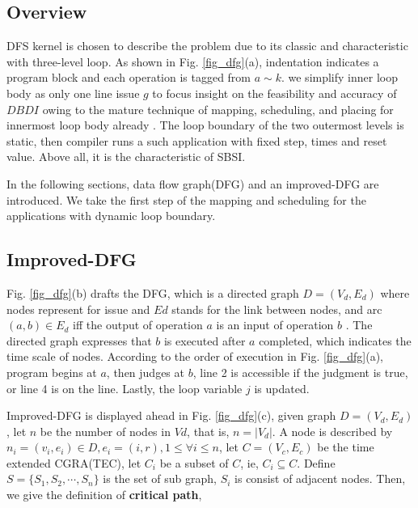 \documentclass[10pt, conference, compsocconf]{IEEEtran}
\begin{document}
\subsection{Overview}
DFS kernel is chosen to describe the problem due to its classic and characteristic with three-level loop. As shown in Fig. \ref{fig_dfg}(a), indentation indicates a program block and each operation is tagged from $a \sim k$. we simplify inner loop body as only one line issue $g$ to focus insight on the feasibility and accuracy of $DBDI$ owing to the mature technique of mapping, scheduling, and placing for innermost loop body already \cite{re-guo2006pattern, re-hatanaka2007modulo, re-park2008edge, re-ahn2006spatial, re-friedman2009spr, re-yoon2009graph, bg-operation, in-flattening,in-chen2014graph, in-liu2013polyhedral, in-friedman2009spr}. The loop boundary of the two outermost levels is static, then compiler runs a such application with fixed step, times and reset value. Above all, it is the characteristic of SBSI.

In the following sections, data flow graph(DFG) and an improved-DFG are introduced. We take the first step of the mapping and scheduling for the applications with dynamic loop boundary.
\subsection{ Improved-DFG}
Fig. \ref{fig_dfg}(b) drafts the DFG, which is a directed graph $D = (V_d,E_d)$ where nodes represent for issue and $Ed$ stands for the link between nodes, and arc $(a,b)\in E_d$ iff the output of operation $a$ is an input of operation $b$ \cite{bg-epimap}. The directed graph expresses that $b$ is executed after $a$ completed, which indicates the time scale of nodes. According to the order of execution in Fig. \ref{fig_dfg}(a), program begins at $a$, then judges at $b$, line 2 is accessible if the judgment is true, or line 4 is on the line. Lastly, the loop variable $j$ is updated.

Improved-DFG is displayed ahead in Fig. \ref{fig_dfg}(c), given graph $D=(V_d,E_d)$, let $n$ be the number of nodes in $Vd$, that is, $n = \left|V_d\right|$. A node is described by $n_i = (v_i,e_i)\in D, e_i=(i,r), 1\leq \forall i \leq n$, let $C =(V_c,E_c)$ be the time extended CGRA(TEC)\cite{bg-epimap}, let $C_i$ be a subset of $C$, ie, $C_i \subseteq C$. Define $S=\{S_1,S_2,\cdots,S_n\}$ is the set of sub graph, $S_i$ is consist of adjacent nodes. Then, we give the definition of \textbf{critical path},
\end{document}
